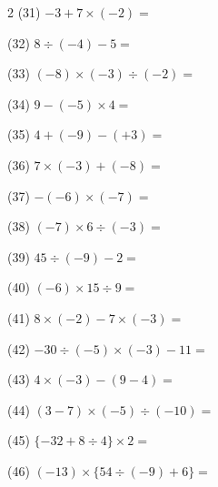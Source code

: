 \documentclass[a4paper, 11pt]{ltjsarticle}
\begin{document}
\begin{multicols*}{2}
\noindent (31) \quad $-3+7\times(-2) =$ \vspace*{\fill}

\noindent (32) \quad $8\div(-4)-5 =$ \vspace*{\fill}

\noindent (33) \quad $(-8)\times(-3)\div(-2) =$ \vspace*{\fill}

\noindent (34) \quad $9-(-5)\times4 =$ \vspace*{\fill}

\noindent (35) \quad $4+(-9)-(+3) =$ \vspace*{\fill}

\noindent (36) \quad $7\times(-3)+(-8) =$ \vspace*{\fill}

\noindent (37) \quad $-(-6)\times(-7) =$ \vspace*{\fill}

\noindent (38) \quad $(-7)\times6\div(-3) =$ \vspace*{\fill}

\columnbreak
\noindent (39) \quad $45\div(-9)-2 =$ \vspace*{\fill}

\noindent (40) \quad $(-6)\times15\div9 =$ \vspace*{\fill}

\noindent (41) \quad $8\times(-2)-7\times(-3) =$ \vspace*{\fill}

\noindent (42) \quad $-30\div(-5)\times(-3)-11 =$ \vspace*{\fill}

\noindent (43) \quad $4\times(-3)-(9-4) =$ \vspace*{\fill}

\noindent (44) \quad $(3-7)\times(-5)\div(-10) =$ \vspace*{\fill}

\noindent (45) \quad $\{-32+8\div4\}\times2 =$ \vspace*{\fill}

\noindent (46) \quad $(-13)\times\{54\div(-9)+6\} =$ \vspace*{\fill}
\end{multicols*}
\end{document}
